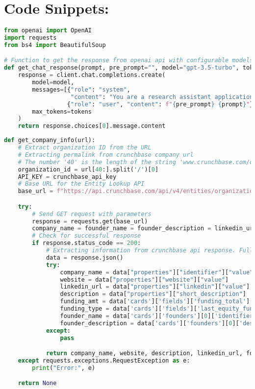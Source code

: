\documentclass[a4paper,11pt]{article}
\begin{document}
\section{Code Snippets:}
\begin{lstlisting}[language=Python, caption=OpenAI Api integration]
from openai import OpenAI
import requests
from bs4 import BeautifulSoup

# Function to get the response from openai api with configurable models and tokens
def get_chat_response(prompt, pre_prompt="", model="gpt-3.5-turbo", tokens=500):
    response = client.chat.completions.create(
        model=model,
        messages=[{"role": "system",
                   "content": "You are a research assistant application whose purpose is to provide results for queries to the user. You only provide the answers without any explanations and introductions. For all the questions asked, return only the required values without other text."},
                  {"role": "user", "content": f"{pre_prompt} {prompt}"}],
        max_tokens=tokens
    )
    return response.choices[0].message.content
\end{lstlisting}
\pagebreak
\begin{lstlisting}[language=Python, caption=Extracting Information using crunchbase api]
def get_company_info(url):
    # Extract organization ID from the URL
    # Extracting permalink from crunchbase company url
    # The number '40' is the length of the string 'www.crunchbase.com/organization'
    organization_id = url[40:].split('/')[0]
    API_KEY = crunchbase_api_key
    # Base URL for the Entity Lookup API
    base_url = f"https://api.crunchbase.com/api/v4/entities/organizations/{organization_id}?card_ids=founders,fields&field_ids=website,linkedin,short_description&user_key={API_KEY}"

    try:
        # Send GET request with parameters
        response = requests.get(base_url)
        company_name = founder_name = founder_description = linkedin_url = website = description = funding_amt = funding_type = None
        # Check for successful response
        if response.status_code == 200:
            # Extracting information from crunchbase api response. Fully customisable to extract relevant information
            data = response.json()
            try:
                company_name = data["properties"]["identifier"]["value"]
                website = data["properties"]["website"]["value"]
                linkedin_url = data["properties"]["linkedin"]["value"]
                description = data["properties"]["short_description"]
                funding_amt = data['cards']['fields']['funding_total']['value_usd']
                funding_type = data['cards']['fields']['last_equity_funding_type']
                founder_name = data['cards']['founders'][0]['identifier']['value']
                founder_description = data['cards']['founders'][0]['description']
            except:
                pass

            return company_name, website, description, linkedin_url, founder_name, founder_description, funding_amt, funding_type
    except requests.exceptions.RequestException as e:
        print("Error:", e)

    return None
\end{lstlisting}
\end{document}
